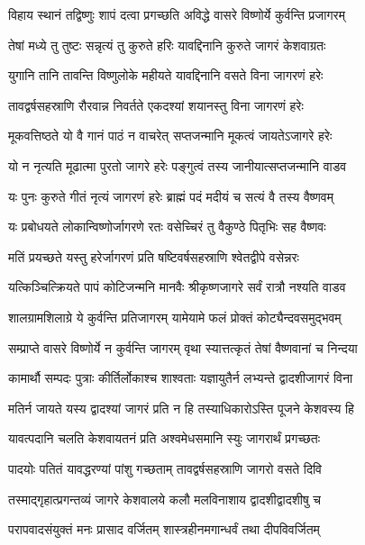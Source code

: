 \twolineshloka
{विहाय स्थानं तद्विष्णुः शापं दत्वा प्रगच्छति}
{अविद्धे वासरे विष्णोर्ये कुर्वन्ति प्रजागरम्}%

\twolineshloka
{तेषां मध्ये तु तुष्टः सन्नृत्यं तु कुरुते हरिः}
{यावद्दिनानि कुरुते जागरं केशवाग्रतः}%

\twolineshloka
{युगानि तानि तावन्ति विष्णुलोके महीयते}
{यावद्दिनानि वसते विना जागरणं हरेः}%

\twolineshloka
{तावद्वर्षसहस्राणि रौरवान्न निवर्तते}
{एकदश्यां शयानस्तु विना जागरणं हरेः}%

\twolineshloka
{मूकवत्तिष्ठते यो वै गानं पाठं न वाचरेत्}
{सप्तजन्मानि मूकत्वं जायतेऽजागरे हरेः}%

\twolineshloka
{यो न नृत्यति मूढात्मा पुरतो जागरे हरेः}
{पङ्गुत्वं तस्य जानीयात्सप्तजन्मानि वाडव}%

\twolineshloka
{यः पुनः कुरुते गीतं नृत्यं जागरणं हरेः}
{ब्राह्मं पदं मदीयं च सत्यं वै तस्य वैष्णवम्}%

\twolineshloka
{यः प्रबोधयते लोकान्विष्णोर्जागरणे रतः}
{वसेच्चिरं तु वैकुण्ठे पितृभिः सह वैष्णवः}%

\twolineshloka
{मतिं प्रयच्छते यस्तु हरेर्जागरणं प्रति}
{षष्टिवर्षसहस्राणि श्वेतद्वीपे वसेन्नरः}%

\twolineshloka
{यत्किञ्चित्क्रियते पापं कोटिजन्मनि मानवैः}
{श्रीकृष्णजागरे सर्वं रात्रौ नश्यति वाडव}%

\twolineshloka
{शालग्रामशिलाग्रे ये कुर्वन्ति प्रतिजागरम्}
{यामेयामे फलं प्रोक्तं कोट्यैन्दवसमुद्भवम्}%

\twolineshloka
{सम्प्राप्ते वासरे विष्णोर्ये न कुर्वन्ति जागरम्}
{वृथा स्यात्तत्कृतं तेषां वैष्णवानां च निन्दया}%

\twolineshloka
{कामार्थौ सम्पदः पुत्राः कीर्तिर्लोकाश्च शाश्वताः}
{यज्ञायुतैर्न लभ्यन्ते द्वादशीजागरं विना}%

\twolineshloka
{मतिर्न जायते यस्य द्वादश्यां जागरं प्रति}
{न हि तस्याधिकारोऽस्ति पूजने केशवस्य हि}%

\twolineshloka
{यावत्पदानि चलति केशवायतनं प्रति}
{अश्वमेधसमानि स्युः जागरार्थं प्रगच्छतः}%

\twolineshloka
{पादयोः पतितं यावद्धरण्यां पांशु गच्छताम्}
{तावद्वर्षसहस्राणि जागरो वसते दिवि}%

\twolineshloka
{तस्माद्गृहात्प्रगन्तव्यं जागरे केशवालये}
{कलौ मलविनाशाय द्वादशीद्वादशीषु च}%

\twolineshloka
{परापवादसंयुक्तं मनः प्रासाद वर्जितम्}
{शास्त्रहीनमगान्धर्वं तथा दीपविवर्जितम्}%

